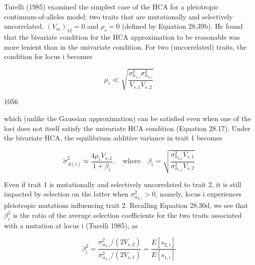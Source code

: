 \documentclass{article}
\begin{document}
Turelli (1985) examined the simplest case of the HCA for a pleiotropic continuum-of-alleles model: two traits that are mutationally and selectively uncorrelated,  $ (V_{m})_{12}=0 $ and  $ \rho_{s}=0 $ (defined by Equation 28.39b). He found that the bivariate condition for the HCA approximation to be reasonable was more lenient than in the univariate condition. For two (uncorrelated) traits, the condition for locus i becomes

\begin{equation}
\mu_{i}\ll\sqrt{\frac{\sigma_{\alpha_{1,i}}^{2}\sigma_{\alpha_{2,i}}^{2}}{V_{s,1}V_{s,2}}}
\tag{28.40}
\label{eq:28_40}
\end{equation}

1056

which (unlike the Gaussian approximation) can be satisfied even when one of the loci does not itself satisfy the univariate HCA condition (Equation 28.17). Under the bivariate HCA, the equilibrium additive variance in trait 1 becomes

\begin{equation}
\widetilde{\sigma}_{A(i)}^{2}\simeq\frac{4\mu_{i}V_{s,1}}{1+\beta_{i}},\quad\mathrm{w h e r e}\quad\beta_{i}=\sqrt{\frac{\sigma_{\alpha_{2,i}}^{2}V_{s,1}}{\sigma_{\alpha_{1,i}}^{2}V_{s,2}}}
\tag{28.41a}
\label{eq:28_41a}
\end{equation}

Even if trait 1 is mutationally and selectively uncorrelated to trait 2, it is still impacted by selection on the latter when  $ \sigma_{\alpha_{2,i}}^{2} > 0 $, namely, locus i experiences pleiotropic mutations influencing trait 2. Recalling Equation 28.30d, we see that  $ \beta_{i}^{2} $ is the ratio of the average selection coefficients for the two traits associated with a mutation at locus i (Turelli 1985), as

\begin{equation}
\beta_{i}^{2}=\frac{\sigma_{\alpha_{2,i}}^{2}/(2V_{s,2})}{\sigma_{\alpha_{1,i}}^{2}/(2V_{s,1})}=\frac{E[s_{2,i}]}{E[s_{1,i}]}
\tag{28.41b}
\label{eq:28_41b}
\end{equation}
\end{document}
